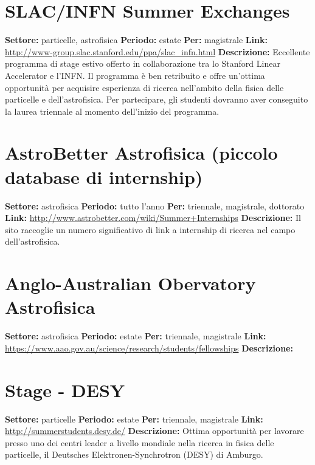 \documentclass[a4paper,10pt]{article}
\begin{document}
\section{SLAC/INFN Summer Exchanges}
\textbf{Settore:} particelle, astrofisica\newline
\textbf{Periodo:} estate \newline
\textbf{Per:} magistrale\newline
\textbf{Link:} \url{http://www-group.slac.stanford.edu/ppa/slac_infn.html} \newline
\textbf{Descrizione:} Eccellente programma di stage estivo offerto in collaborazione tra lo Stanford Linear Accelerator e l'INFN. Il programma è ben retribuito e offre un'ottima opportunità per acquisire esperienza di ricerca nell'ambito della fisica delle particelle e dell'astrofisica. Per partecipare, gli studenti dovranno aver conseguito la laurea triennale al momento dell'inizio del programma.  

\section{AstroBetter  Astrofisica (piccolo database di internship)}
\textbf{Settore:} astrofisica \newline
\textbf{Periodo:} tutto l'anno\newline
\textbf{Per:} triennale, magistrale, dottorato\newline
\textbf{Link:} \url{http://www.astrobetter.com/wiki/Summer+Internships} \newline
\textbf{Descrizione:} Il sito raccoglie un numero significativo di link a internship di ricerca nel campo dell'astrofisica. 

\section{Anglo-Australian Obervatory Astrofisica}
\textbf{Settore:} astrofisica \newline
\textbf{Periodo:} estate\newline
\textbf{Per:} triennale, magistrale\newline
\textbf{Link:} \url{https://www.aao.gov.au/science/research/students/fellowships} \newline
\textbf{Descrizione:}   

\section{ Stage - DESY}
\textbf{Settore:} particelle \newline
\textbf{Periodo:} estate\newline
\textbf{Per:} triennale, magistrale\newline
\textbf{Link:} \url{http://summerstudents.desy.de/} \newline
\textbf{Descrizione:} Ottima opportunità per lavorare presso uno dei centri leader a livello mondiale nella ricerca in fisica delle particelle, il Deutsches Elektronen-Synchrotron (DESY) di Amburgo.  
\end{document}
